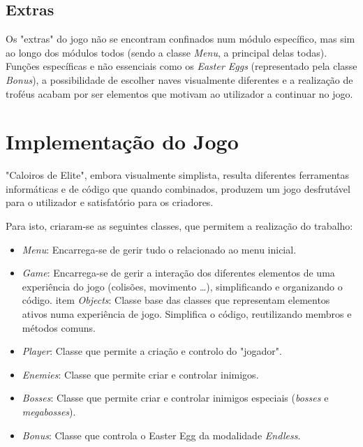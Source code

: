 \documentclass[a4paper,11pt]{article}
\newcommand\tab[1][0.8cm]{\hspace*{#1}}
\begin{document}
\vspace{8pt}

\subsection*{Extras}

\vspace{8pt}

Os "extras" do jogo não se encontram confinados num módulo específico, mas sim ao longo dos módulos todos (sendo a classe \textit{Menu}, a principal delas todas). Funções específicas e não essenciais como os \textit{Easter Eggs} (representado pela classe \textit{Bonus}), a possibilidade de escolher naves visualmente diferentes e a realização de troféus acabam por ser elementos que motivam ao utilizador a continuar no jogo.

\pagebreak

\section{Implementação do Jogo}

\vspace{8pt}

\tab "Caloiros de Elite", embora visualmente simplista, resulta diferentes ferramentas informáticas e de código que quando combinados, produzem um jogo desfrutável para o utilizador e satisfatório para os criadores.

\vspace{8pt}

Para isto, criaram-se as seguintes classes, que permitem a realização do trabalho:

\begin{itemize}
    \item  \textit{Menu}: Encarrega-se de gerir tudo o relacionado ao menu inicial.
    \item \textit{Game}: Encarrega-se de gerir a interação dos diferentes elementos de uma experiência do jogo (colisões, movimento \dots), simplificando e organizando o código.
          item  \textit{Objects}: Classe base das classes que representam elementos ativos numa experiência de jogo. Simplifica o código, reutilizando membros e métodos comuns.
    \item \textit{Player}: Classe que permite a criação e controlo do "jogador".
    \item  \textit{Enemies}: Classe que permite criar e controlar inimigos.
    \item \textit{Bosses}: Classe que permite criar e controlar inimigos especiais (\textit{bosses} e \textit{megabosses}).
    \item \textit{Bonus}: Classe que controla o Easter Egg da modalidade \textit{Endless}.
\end{itemize}
\end{document}
